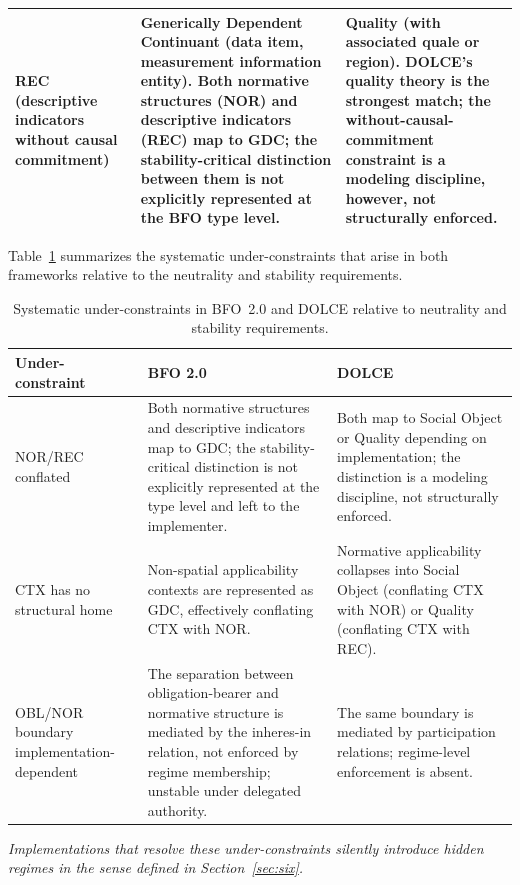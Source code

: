 \begin{table}[!htbp]
\begin{tabular}{@{} p{1.5cm} p{5.2cm} p{4.7cm}@{}}
REC (descriptive indicators without causal commitment) &
Generically Dependent Continuant (data item,
measurement information entity).
Both normative structures (NOR) and descriptive indicators (REC)
map to GDC; the stability-critical distinction between them
is not explicitly represented at the BFO type level. &
Quality (with associated quale or region).
DOLCE's quality theory is the strongest match;
the without-causal-commitment constraint is a modeling
discipline, however, not structurally enforced. \\

\bottomrule
\end{tabular}
\end{table}

Table~\ref{tab:underconstraints} summarizes the systematic under-constraints
that arise in both frameworks relative to the neutrality and stability requirements.

\begin{table}[!hb]
\centering
\caption{Systematic under-constraints in BFO~2.0 and DOLCE relative to
neutrality and stability requirements.}
\label{tab:underconstraints}
\small
\renewcommand{\arraystretch}{1.35}
\begin{tabular}{@{} p{2cm} p{4.7cm} p{4.7cm} @{}}
\toprule
\textbf{Under-constraint} & \textbf{BFO 2.0} & \textbf{DOLCE} \\
\midrule


NOR/REC conflated &
Both normative structures and descriptive indicators map to GDC;
the stability-critical distinction is not explicitly represented
at the type level and left to the implementer. &
Both map to Social Object or Quality depending on implementation;
the distinction is a modeling discipline, not structurally enforced. \\

CTX has no structural home &
Non-spatial applicability contexts are represented as GDC, effectively
conflating CTX with NOR. &
Normative applicability collapses into Social Object (conflating CTX
with NOR) or Quality (conflating CTX with REC). \\

OBL/NOR boundary implementation-dependent &
The separation between obligation-bearer and normative structure
is mediated by the inheres-in relation, not enforced by
regime membership; unstable under delegated authority. &
The same boundary is mediated by participation relations;
regime-level enforcement is absent. \\

\bottomrule
\end{tabular}
\smallskip
\begin{minipage}{\textwidth}
\footnotesize
\textit{Implementations that resolve these under-constraints silently
introduce hidden regimes in the sense defined in Section~\ref{sec:six}.}
\end{minipage}
\end{table}

